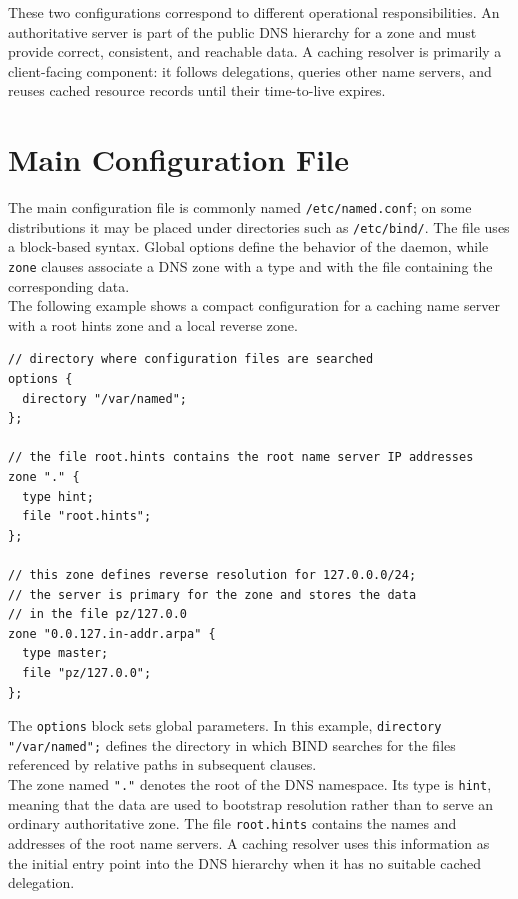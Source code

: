 \documentclass{scrbook}
\begin{document}
	These two configurations correspond to different operational responsibilities. An authoritative server is part of the public DNS hierarchy for a zone and must provide correct, consistent, and reachable data. A caching resolver is primarily a client-facing component: it follows delegations, queries other name servers, and reuses cached resource records until their time-to-live expires.
	
	\section{Main Configuration File}
	
	The main configuration file is commonly named \texttt{/etc/named.conf}; on some distributions it may be placed under directories such as \texttt{/etc/bind/}. The file uses a block-based syntax. Global options define the behavior of the daemon, while \texttt{zone} clauses associate a DNS zone with a type and with the file containing the corresponding data.\\
	
	The following example shows a compact configuration for a caching name server with a root hints zone and a local reverse zone.
	
	\begin{lstlisting}
// directory where configuration files are searched
options {
  directory "/var/named";
};

// the file root.hints contains the root name server IP addresses
zone "." {
  type hint;
  file "root.hints";
};

// this zone defines reverse resolution for 127.0.0.0/24;
// the server is primary for the zone and stores the data
// in the file pz/127.0.0
zone "0.0.127.in-addr.arpa" {
  type master;
  file "pz/127.0.0";
};
	\end{lstlisting}
	
	The \texttt{options} block sets global parameters. In this example, \texttt{directory "/var/named";} defines the directory in which BIND searches for the files referenced by relative paths in subsequent clauses.\\
	
	The zone named \texttt{"."} denotes the root of the DNS namespace. Its type is \texttt{hint}, meaning that the data are used to bootstrap resolution rather than to serve an ordinary authoritative zone. The file \texttt{root.hints} contains the names and addresses of the root name servers. A caching resolver uses this information as the initial entry point into the DNS hierarchy when it has no suitable cached delegation.\\
	
\end{document}
